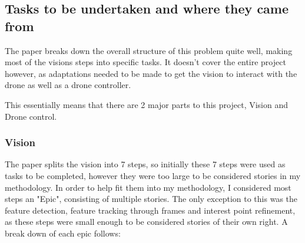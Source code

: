 \subsection{Tasks to be undertaken and where they came from}

The paper \cite{PhoneObstacleAvoidance} breaks down the overall structure of this problem quite well, making most of the visions steps into specific tasks. It doesn't cover the entire project however, as adaptations needed to be made to get the vision to interact with the drone as well as a drone controller. 

This essentially means that there are 2 major parts to this project, Vision and Drone control.

\subsubsection{Vision}
The paper splits the vision into 7 steps, so initially these 7 steps were used as tasks to be completed, however they were too large to be considered stories in my methodology. In order to help fit them into my methodology, I considered most steps an "Epic", consisting of multiple stories. The only exception to this was the feature detection, feature tracking through frames and interest point refinement, as these steps were small enough to be considered stories of their own right. A break down of each epic follows:

